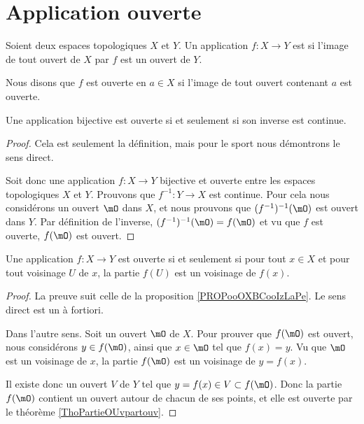 \section{Application ouverte}

\begin{definition}
    Soient deux espaces topologiques \( X\) et \( Y\). Un application \( f\colon X\to Y\) est  si l'image de tout ouvert de \( X\) par \( f\) est un ouvert de \( Y\).

    Nous disons que \( f\) est ouverte en \( a\in X\) si l'image de tout ouvert contenant \( a\) est ouverte.
\end{definition}

\begin{proposition}     \label{PROPooXGEGooHoMsne}
    Une application bijective est ouverte si et seulement si son inverse est continue.
\end{proposition}

\begin{proof}
    Cela est seulement la définition, mais pour le sport nous démontrons le sens direct.

    Soit donc une application \( f\colon X\to Y\) bijective et ouverte entre les espaces topologiques \( X\) et \( Y\). Prouvons que \( f^{-1}\colon Y\to X\) est continue. Pour cela nous considérons un ouvert \( \mO\) dans \( X\), et nous prouvons que \( (f^{-1})^{-1}(\mO)\) est ouvert dans \( Y\). Par définition de l'inverse, \( (f^{-1})^{-1}(\mO)=f(\mO)\) et vu que \( f\) est ouverte, \( f(\mO)\) est ouvert.
\end{proof}

\begin{lemma}       \label{LEMooHHIPooEpGfCg}
    Une application \( f\colon X\to Y\) est ouverte si et seulement si pour tout \( x\in X\) et pour tout voisinage \( U\) de \( x\), la partie \( f(U)\) est un voisinage de \( f(x)\).
\end{lemma}

\begin{proof}
    La preuve suit celle de la proposition \ref{PROPooOXBCooIzLaPe}. Le sens direct est un à fortiori.

    Dans l'autre sens. Soit un ouvert \( \mO\) de \( X\). Pour prouver que \( f(\mO)\) est ouvert, nous considérons \( y\in f(\mO)\), ainsi que \( x\in\mO\) tel que \( f(x)=y\). Vu que \( \mO\) est un voisinage de \( x\), la partie \( f(\mO)\) est un voisinage de \( y=f(x)\).

    Il existe donc un ouvert \( V\) de \( Y\) tel que \( y=f(x)\in V\subset f(\mO)\). Donc la partie \( f(\mO)\) contient un ouvert autour de chacun de ses points, et elle est ouverte par le théorème \ref{ThoPartieOUvpartouv}.
\end{proof}


